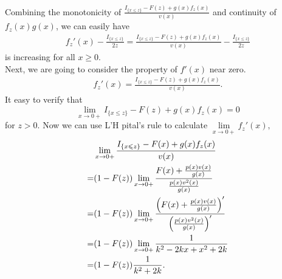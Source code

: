 \documentclass[a4paper,11pt,draft]{article}
\makeatletter
\numberwithin{equation}{section}
\theoremstyle{plain}
\theoremstyle{definition}
\theoremstyle{remark}
\let\original@left\left
\let\original@right\right
\renewcommand{\left}{\mathopen{}\mathclose\bgroup\original@left}
\renewcommand{\right}{\aftergroup\egroup\original@right}
\def\^#1{\relax\ifmmode {\mathaccent"705E #1} \else {\accent94 #1} \fi}
\renewcommand{\leq}{\leqslant}
\renewcommand{\geq}{\geqslant}
\makeatother
\begin{document}
Combining the monotonicity of $\frac{I_{\{x\leq z\}}-F(z)+g(x)f_{z}(x)}{v(x)}$ and  continuity of
$f_{z}(x)g(x)$, we can easily have 
\begin{equation}\label{p7}
\begin{aligned}
	f_{z}'(x)-\frac{I_{\{x\leq z\}}}{2z}=
	\frac{I_{\{x\leq z\}}-F(z)+g(x)f_{z}(x)}{v(x)}-\frac{I_{\{x\leq z\}}}{2z} 
\end{aligned}
\end{equation}
is increasing for all $x\geq 0. $\\
\indent Next, we are going to consider the property of $f'(x)$ near zero. 
\begin{equation}\label{p8}
\begin{aligned}
	f_{z}'(x)=\frac{I_{\{x\leq z\}}-F(z)+g(x)f_{z}(x)}{v(x)} .
\end{aligned}
\end{equation}
It easy to verify that 
\begin{equation}\label{p9}
	\lim\limits_{x\rightarrow0+}I_{\{x\leq z\}}-F(z)+g(x)f_{z}(x)=0
\end{equation}
for $z>0$. Now we can use L'H\^{o}pital's rule to calculate
$\lim\limits_{x\rightarrow0+}f_{z}'(x),$
\begin{equation}\label{p10}
\begin{aligned}
&\lim\limits_{x\rightarrow0+}\frac{I_{\{x\leq z\}}-F(x)+g(x)f_{z}(x)}{v(x)}\\=&(1-F(z))\lim\limits_{x\rightarrow0+}\frac{F(x)+\frac{p(x)v(x)}{g(x)}}{\frac{p(x)v^2(x)}{g(x)}}\\
	=&(1-F(z))\lim\limits_{x\rightarrow0+}\frac{\left( F(x)+\frac{p(x)v(x)}{g(x)}\right)' }{\left( \frac{p(x)v^2(x)}{g(x)}\right) '}\\
	=&(1-F(z))\lim\limits_{x\rightarrow0+}\frac{1}{k^2-2kx+x^2+2k}\\
	=&(1-F(z))\frac{1}{k^2+2k}.
\end{aligned}
\end{equation}

 \setlength{\bibsep}{0.5ex}
 \def\bibfont{\small}
%

%
%
%



\end{document}
